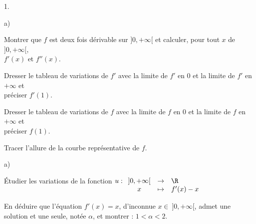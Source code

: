 \documentclass[11pt]{article}%
\begin{document}
\begin{noliste}{1.}
  \setlength{\itemsep}{2mm}
\item 
  \begin{noliste}{a)}
  \item Montrer que $f$ est deux fois dérivable sur $]0,+\infty[$ et
    calculer, pour tout $x$ de $]0,+\infty[$,\\
    $f'(x)$ et $f''(x)$.
    
    	
    
  \item Dresser le tableau de variations de $f'$ avec la limite de
    $f'$ en $0$ et la limite de $f'$ en $+\infty$ et \\ préciser
    $f'(1)$.
    
    
  \end{noliste}
  
  
  

\item Dresser le tableau de variations de $f$ avec la limite de $f$ en
  $0$ et la limite de $f$ en $+\infty$ et\\
  préciser $f(1)$.
  
  
  
\item Tracer l'allure de la courbe représentative de $f$.
  
  
    
    
  \item 
    \begin{noliste}{a)}
    \item Étudier les variations de la fonction $u:
    \begin{array}[t]{ccl}
      ]0,+\infty[ & \rightarrow & \R\\
      x & \mapsto & f'(x)-x
    \end{array}$
    
    
    


	
  \item En déduire que l'équation $f'(x)=x$, d'inconnue $x\in \
    ]0,+\infty[$, admet une solution et une seule, notée $\alpha$, et
    montrer : $1<\alpha<2$.
  \end{noliste}      
 
    
\end{noliste}


\end{document}
